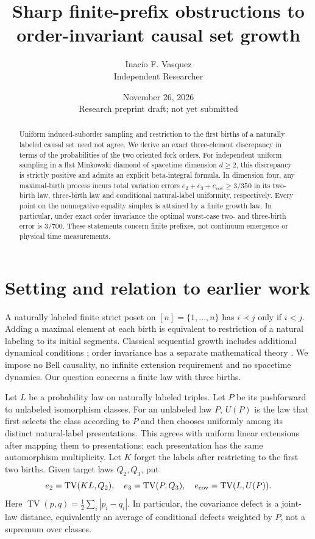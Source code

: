 \documentclass[11pt]{article}
\title{Sharp finite-prefix obstructions to order-invariant causal set growth}
\author{Inacio F. Vasquez\\ Independent Researcher}
\date{November 26, 2026 \\ \small Research preprint draft; not yet submitted}
\newcommand{\TV}{\operatorname{TV}}
\begin{document}
\maketitle
\begin{abstract}
Uniform induced-suborder sampling and restriction to the first births of a naturally labeled causal set need not agree. We derive an exact three-element discrepancy in terms of the probabilities of the two oriented fork orders. For independent uniform sampling in a flat Minkowski diamond of spacetime dimension $d\ge2$, this discrepancy is strictly positive and admits an explicit beta-integral formula. In dimension four, any maximal-birth process incurs total variation errors $e_2+e_3+e_{\mathrm{cov}}\ge 3/350$ in its two-birth law, three-birth law and conditional natural-label uniformity, respectively. Every point on the nonnegative equality simplex is attained by a finite growth law. In particular, under exact order invariance the optimal worst-case two- and three-birth error is $3/700$. These statements concern finite prefixes, not continuum emergence or physical time measurements.
\end{abstract}
\section{Setting and relation to earlier work}
A naturally labeled finite strict poset on $[n]=\{1,\ldots,n\}$ has $i\prec j$ only if $i<j$. Adding a maximal element at each birth is equivalent to restriction of a natural labeling to its initial segments. Classical sequential growth includes additional dynamical conditions \cite{rideout}; order invariance has a separate mathematical theory \cite{brightwell}. We impose no Bell causality, no infinite extension requirement and no spacetime dynamics. Our question concerns a finite law with three births.

Let $L$ be a probability law on naturally labeled triples. Let $P$ be its pushforward to unlabeled isomorphism classes. For an unlabeled law $P$, $U(P)$ is the law that first selects the class according to $P$ and then chooses uniformly among its distinct natural-label presentations. This agrees with uniform linear extensions after mapping them to presentations: each presentation has the same automorphism multiplicity. Let $K$ forget the labels after restricting to the first two births. Given target laws $Q_2,Q_3$, put
\[
e_2=\TV(KL,Q_2),\quad e_3=\TV(P,Q_3),\quad e_{\rm cov}=\TV(L,U(P)).
\]
Here $\TV(p,q)=\frac12\sum_i|p_i-q_i|$. In particular, the covariance defect is a joint-law distance, equivalently an average of conditional defects weighted by $P$, not a supremum over classes.
\end{document}
